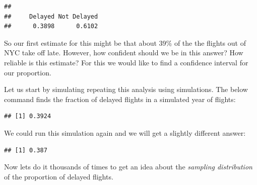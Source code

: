 \documentclass[
]{book}
\newenvironment{Shaded}{\begin{snugshade}}{\end{snugshade}}
\newcommand{\AttributeTok}[1]{\textcolor[rgb]{0.77,0.63,0.00}{#1}}
\newcommand{\ConstantTok}[1]{\textcolor[rgb]{0.00,0.00,0.00}{#1}}
\newcommand{\DecValTok}[1]{\textcolor[rgb]{0.00,0.00,0.81}{#1}}
\newcommand{\FunctionTok}[1]{\textcolor[rgb]{0.00,0.00,0.00}{#1}}
\newcommand{\NormalTok}[1]{#1}
\newcommand{\OtherTok}[1]{\textcolor[rgb]{0.56,0.35,0.01}{#1}}
\newcommand{\SpecialCharTok}[1]{\textcolor[rgb]{0.00,0.00,0.00}{#1}}
\newcommand{\StringTok}[1]{\textcolor[rgb]{0.31,0.60,0.02}{#1}}
\theoremstyle{definition}
\theoremstyle{definition}
\theoremstyle{definition}
\theoremstyle{definition}
\theoremstyle{remark}
\begin{document}
\begin{verbatim}
## 
##     Delayed Not Delayed 
##      0.3898      0.6102
\end{verbatim}

So our first estimate for this might be that about 39\% of the the flights out of NYC take off late. However, how confident should we be in this answer? How reliable is this estimate? For this we would like to find a confidence interval for our proportion.

Let us start by simulating repeating this analysis using simulations. The below command finds the fraction of delayed flights in a simulated year of flights:

\begin{Shaded}
\end{Shaded}

\begin{verbatim}
## [1] 0.3924
\end{verbatim}

We could run this simulation again and we will get a slightly different answer:

\begin{Shaded}
\end{Shaded}

\begin{verbatim}
## [1] 0.387
\end{verbatim}

Now lets do it thousands of times to get an idea about the \emph{sampling distribution} of the proportion of delayed flights.

\begin{Shaded}
\end{Shaded}
\end{document}
